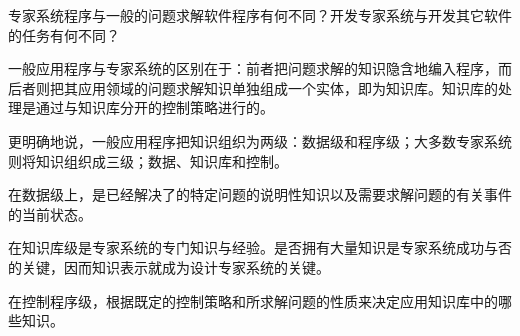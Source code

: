 \begin{question}
专家系统程序与一般的问题求解软件程序有何不同？开发专家系统与开发其它软件的任务有何不同？
\end{question}
\begin{solution}
一般应用程序与专家系统的区别在于：前者把问题求解的知识隐含地编入程序，而后者则把其应用领域的问题求解知识单独组成一个实体，即为知识库。知识库的处理是通过与知识库分开的控制策略进行的。\par
更明确地说，一般应用程序把知识组织为两级：数据级和程序级；大多数专家系统则将知识组织成三级；数据、知识库和控制。\par
在数据级上，是已经解决了的特定问题的说明性知识以及需要求解问题的有关事件的当前状态。\par
在知识库级是专家系统的专门知识与经验。是否拥有大量知识是专家系统成功与否的关键，因而知识表示就成为设计专家系统的关键。\par
在控制程序级，根据既定的控制策略和所求解问题的性质来决定应用知识库中的哪些知识。
\end{solution}

